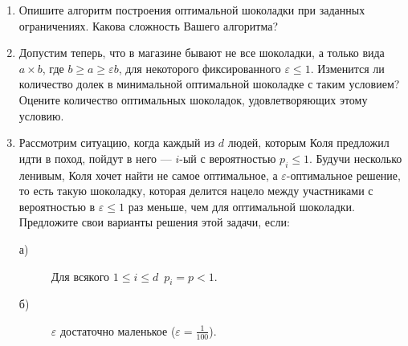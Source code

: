 \begin{enumerate}
\item Опишите алгоритм построения оптимальной шоколадки при заданных ограничениях. Какова сложность Вашего алгоритма?
\item Допустим теперь, что в магазине бывают не все шоколадки, а только вида $a\times b$, где $b\geq a\geq \varepsilon b$, для некоторого фиксированного $\varepsilon\leq 1$. Изменится ли количество долек в минимальной оптимальной шоколадке с таким условием? Оцените количество оптимальных шоколадок, удовлетворяющих этому условию.
\item Рассмотрим ситуацию, когда каждый из $d$ людей, которым Коля предложил идти в поход, пойдут в него --- $i$-ый с вероятностью $p_i\leq 1$. Будучи несколько ленивым, Коля хочет найти не самое оптимальное, а $\varepsilon$-оптимальное решение, то есть такую шоколадку, которая делится нацело между участниками с вероятностью в $\varepsilon\leq 1$ раз меньше, чем для оптимальной шоколадки.
Предложите свои варианты решения этой задачи, если:
\begin{description}
\item [а)] Для всякого $1\leq i\leq d\,$ $p_i=p<1$.
\item [б)] $\varepsilon$ достаточно маленькое ($\varepsilon=\frac{1}{100}$).
\end{description}

\end{enumerate}



